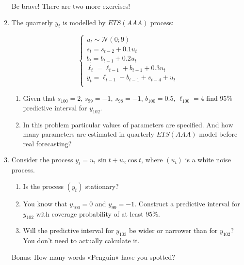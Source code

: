 \documentclass[12pt]{article}
\newcommand{\cN}{\mathcal{N}}
\begin{document}
\begin{enumerate}
    Be brave! There are two more exercises!
    \newpage

    \item The quarterly $y_t$ is modelled by $ETS(AAA)$ process:
    
    \[
    \begin{cases}
        u_t \sim \cN(0; 9) \\
        s_t = s_{t-2} + 0.1 u_t \\
        b_t = b_{t-1} + 0.2 u_t \\
        \ell_t = \ell_{t-1} + b_{t-1} + 0.3 u_t \\
        y_t = \ell_{t-1} + b_{t-1} + s_{t-4} + u_t \\
    \end{cases}    
    \]

    \begin{enumerate}
        \item Given that $s_{100} = 2$, $s_{99} = -1$, $s_{98}=-1$, $b_{100} = 0.5$, $\ell_{100} = 4$ find 95\% predictive interval for $y_{102}$. 
        \item In this problem particular values of parameters are specified. And how many parameters are estimated in quarterly $ETS(AAA)$ model before real forecasting?
    \end{enumerate}

    \item Consider the process $y_t = u_1 \sin t + u_2 \cos t$, where $(u_t)$ is a white noise process.
    \begin{enumerate}
        \item Is the process $(y_t)$ stationary?
        \item You know that $y_{100} = 0$ and $y_{99}=-1$. Construct a predictive interval for $y_{102}$ with coverage probability of at least 95\%. 
        \item Will the predictive interval for $y_{103}$ be wider or narrower than for $y_{102}$? You don't need to actually calculate it. 
    \end{enumerate}
    
    \item[Bonus:] How many words «Penguin» have you spotted?
    
 
\end{enumerate}
\end{document}
